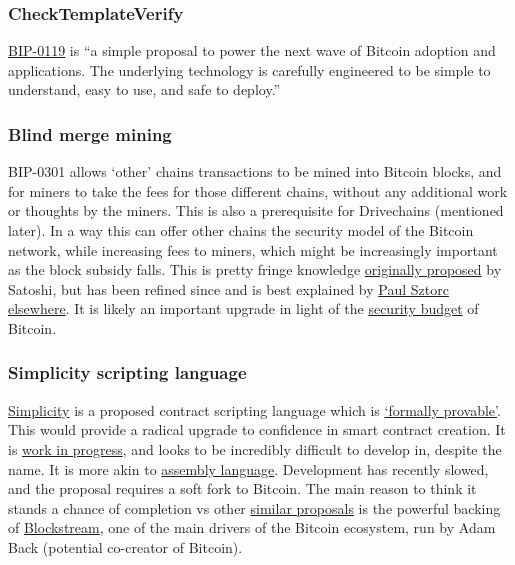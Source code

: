 \subsubsection{CheckTemplateVerify}
\href{https://utxos.org/}{BIP-0119} is ``a simple proposal to power the next wave of Bitcoin adoption and applications. The underlying technology is carefully engineered to be simple to understand, easy to use, and safe to deploy.''
\subsubsection{Blind merge mining}
BIP-0301 allows `other' chains transactions to be mined into Bitcoin blocks, and for miners to take the fees for those different chains, without any additional work or thoughts by the miners. This is also a prerequisite for Drivechains (mentioned later). In a way this can offer other chains the security model of the Bitcoin network, while increasing fees to miners, which might be increasingly important as the block subsidy falls. This is pretty fringe knowledge \href{https://bitcointalk.org/index.php?topic=1790.msg28696#msg28696}{originally proposed} by Satoshi, but has been refined since and is best explained by \href{https://www.youtube.com/watch?v=xweFaw69EyA}{Paul Sztorc elsewhere}. It is likely an important upgrade in light of the \href{https://www.truthcoin.info/blog/security-budget/}{security budget} of Bitcoin.
\subsubsection{Simplicity scripting language}
\href{https://blockstream.com/simplicity.pdf}{Simplicity} is a proposed contract scripting language which is \href{https://coq.inria.fr/}{`formally provable'}. This would provide a radical upgrade to confidence in smart contract creation. It is \href{https://github.com/ElementsProject/simplicity/blob/pdf/Simplicity-TR.pdf}{work in progress}, and looks to be incredibly difficult to develop in, despite the name. It is more akin to \href{https://en.wikipedia.org/wiki/Assembly_language}{assembly language}. Development has recently slowed, and the proposal requires a soft fork to Bitcoin. The main reason to think it stands a chance of completion vs other \href{https://lists.linuxfoundation.org/pipermail/bitcoin-dev/2022-March/020036.html}{similar proposals} is the powerful backing of \href{https://blockstream.com/}{Blockstream}, one of the main drivers of the Bitcoin ecosystem, run by Adam Back (potential co-creator of Bitcoin). 
